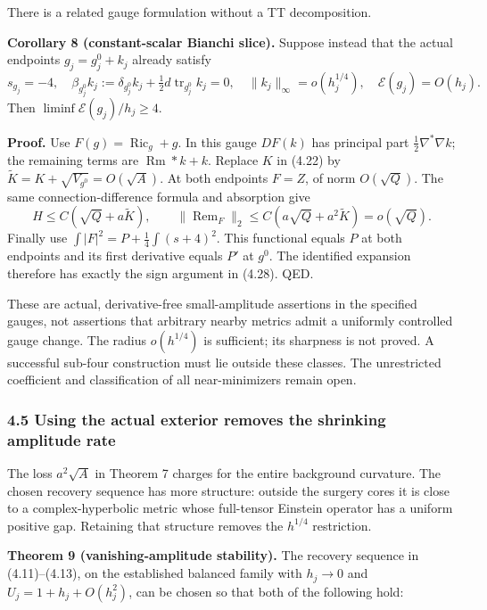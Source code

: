 \documentclass[
  11pt,
]{article}
\begin{document}
There is a related gauge formulation without a TT decomposition.

\textbf{Corollary 8 (constant-scalar Bianchi slice).} Suppose instead
that the actual endpoints \(g_j=g_j^0+k_j\) already satisfy \[
 s_{g_j}=-4,\quad
 \beta_{g_j^0}k_j
    :=\delta_{g_j^0}k_j+\tfrac12d\operatorname{tr}_{g_j^0}k_j=0,
 \quad \|k_j\|_\infty=o(h_j^{1/4}),\quad
 \mathcal E(g_j)=O(h_j).
 \tag{4.29}
\] Then \(\liminf\mathcal E(g_j)/h_j\ge4\).

\textbf{Proof.} Use \(F(g)=\operatorname{Ric}_g+g\). In this gauge
\(DF(k)\) has principal part \(\frac12\nabla^*\nabla k\); the remaining
terms are \(\operatorname{Rm}*k+k\). Replace \(K\) in (4.22) by
\(\widetilde K=K+\sqrt{V_{g^0}}=O(\sqrt A)\). At both endpoints \(F=Z\),
of norm \(O(\sqrt Q)\). The same connection-difference formula and
absorption give \[
 H\le C(\sqrt Q+a\widetilde K),\qquad
 \|\operatorname{Rem}_F\|_2
                  \le C(a\sqrt Q+a^2\widetilde K)=o(\sqrt Q).
\] Finally use \(\int|F|^2=P+\frac14\int(s+4)^2\). This functional
equals \(P\) at both endpoints and its first derivative equals \(P'\) at
\(g^0\). The identified expansion therefore has exactly the sign
argument in (4.28). QED.

These are actual, derivative-free small-amplitude assertions in the
specified gauges, not assertions that arbitrary nearby metrics admit a
uniformly controlled gauge change. The radius \(o(h^{1/4})\) is
sufficient; its sharpness is not proved. A successful sub-four
construction must lie outside these classes. The unrestricted
coefficient and classification of all near-minimizers remain open.

\hypertarget{using-the-actual-exterior-removes-the-shrinking-amplitude-rate}{%
\subsubsection{4.5 Using the actual exterior removes the shrinking
amplitude
rate}\label{using-the-actual-exterior-removes-the-shrinking-amplitude-rate}}

The loss \(a^2\sqrt A\) in Theorem 7 charges for the entire background
curvature. The chosen recovery sequence has more structure: outside the
surgery cores it is close to a complex-hyperbolic metric whose
full-tensor Einstein operator has a uniform positive gap. Retaining that
structure removes the \(h^{1/4}\) restriction.

\textbf{Theorem 9 (vanishing-amplitude stability).} The recovery
sequence in (4.11)--(4.13), on the established balanced family with
\(h_j\to0\) and \(U_j=1+h_j+O(h_j^2)\), can be chosen so that both of
the following hold:
\end{document}
